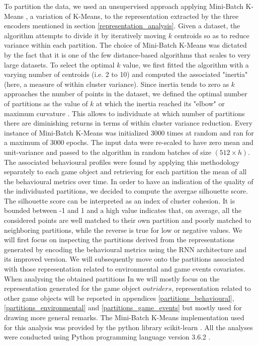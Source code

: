 To partition the data, we used an unsupervised approach applying Mini-Batch K-Means \cite{sculley2010web}, a variation of K-Means, to the representation extracted by the three encoders mentioned in section \ref{representation_analysis}. Given a dataset, the algorithm attempts to divide it by iteratively moving $k$ centroids so as to reduce variance within each partition. The choice of Mini-Batch K-Means was dictated by the fact that it is one of the few distance-based algorithms that scales to very large datasets. To select the optimal $k$ value, we first fitted the algorithm with a varying number of centroids (i.e. 2 to 10) and computed the associated "inertia" (here, a measure of within cluster variance). Since inertia tends to zero as $k$ approaches the number of points in the dataset, we defined the optimal number of partitions as the value of $k$ at which the inertia reached its "elbow" or maximum curvature \cite{satopaa2011finding}. This allows to individuate at which number of partitions there are diminishing returns in terms of within cluster variance reduction. Every instance of Mini-Batch K-Means was initialized 3000 times at random and ran for a maximum of 3000 epochs. The input data were re-scaled to have zero mean and unit-variance and passed to the algorithm in random batches of size $(512 \times h)$. The associated behavioural profiles were found by applying this methodology separately to each game object and retrieving for each partition the mean of all the behavioural metrics over time. In order to have an indication of the quality of the individuated partitions, we decided to compute the avergae silhouette score. The silhouette score can be interpreted as an index of cluster cohesion. It is bounded between -1 and 1 and a high value indicates that, on average, all the considered points are well matched to their own partition and poorly matched to neighboring partitions, while the reverse is true for low or negative values. We will first focus on inspecting the partitions derived from the representations generated by encoding the behavioural metrics using the RNN architecture and its improved version. We will subsequently move onto the partitions associated with those representation related to environmental and game events covariates. When analysing the obtained partitions In we will mostly focus on the representation generated for the game object $outriders$, representation related to other game objects will be reported in appendices \ref{partitions_behavioural}, \ref{partitions_environmental} and \ref{partitions_game_events} but mostly used for drawing more general remarks. The Mini-Batch K-Means implementation used for this analysis was provided by the python library scikit-learn \cite{scikit-learn}. All the analyses were conducted using Python programming language version 3.6.2 \cite{10.5555/1593511}.

